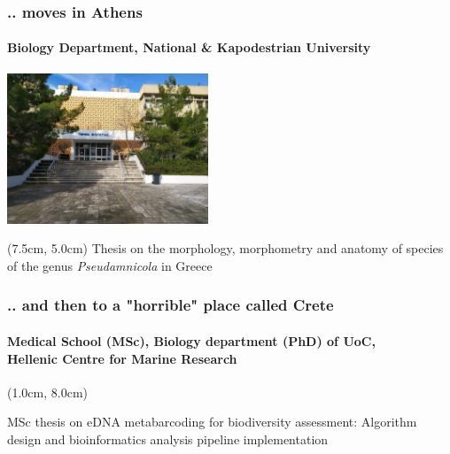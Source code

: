 \documentclass{beamer}
\begin{document}
   \begin{frame}
      \frametitle{.. moves in Athens}
      \framesubtitle{Biology Department, National \& Kapodestrian University}
      \includegraphics[width=60mm]{resources/biol_depart_ekpa.jpg} 
      \begin{textblock*}{5cm}(7.5cm, 5.0cm)
         \small Thesis on the morphology, morphometry and anatomy of species of the genus \textit{Pseudamnicola} in Greece
      \end{textblock*}
   \end{frame}

   \begin{frame}

      \frametitle{.. and then to a "horrible" place called Crete}
      \framesubtitle{
         Medical School (MSc), Biology department (PhD) of UoC, \\
         Hellenic Centre for Marine Research
         }


      \begin{textblock*}{10cm}(1.0cm, 8.0cm)

         \small MSc thesis on eDNA metabarcoding for biodiversity assessment: 
         Algorithm design and bioinformatics analysis pipeline implementation
         
      \end{textblock*}


   \end{frame}
\end{document}
